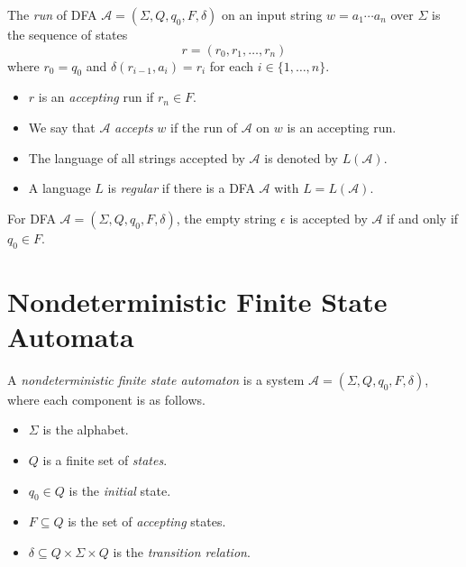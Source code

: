\begin{definition}\label{def:dfa-run}
  The \emph{run} of DFA $\mathcal{A} = (\Sigma, Q, q_0, F, \delta)$ on an input
  string $w = a_1 \cdots a_n$ over $\Sigma$ is the sequence of states
  \begin{equation*}
    r = (r_0, r_1, \dots, r_n)
  \end{equation*}
  where $r_0 = q_0$ and $\delta(r_{i-1}, a_i) = r_i$ for each
  $i \in \{1, \dots, n\}$.
  \begin{itemize}
    \item $r$ is an \emph{accepting} run if $r_n \in F$.
    \item We say that $\mathcal{A}$ \emph{accepts} $w$ if the run of
      $\mathcal{A}$ on $w$ is an accepting run.
    \item The language of all strings accepted by $\mathcal{A}$ is denoted by
      $L(\mathcal{A})$.
    \item A language $L$ is \emph{regular} if there is a DFA $\mathcal{A}$ with
      $L = L(\mathcal{A})$.
  \end{itemize}
\end{definition}

\begin{remark}
  For DFA $\mathcal{A} = (\Sigma, Q, q_0, F, \delta)$, the empty string
  $\epsilon$ is accepted by $\mathcal{A}$ if and only if $q_0 \in F$.
\end{remark}

\section{Nondeterministic Finite State Automata}
\begin{definition}\label{def:nfa}
  A \emph{nondeterministic finite state automaton} is a system
  $\mathcal{A} = (\Sigma, Q, q_0, F, \delta)$, where each component is as
  follows.
  \begin{itemize}
    \item $\Sigma$ is the alphabet.
    \item $Q$ is a finite set of \emph{states}.
    \item $q_0 \in Q$ is the \emph{initial} state.
    \item $F \subseteq Q$ is the set of \emph{accepting} states.
    \item $\delta \subseteq Q \times \Sigma \times Q$ is the
      \emph{transition relation}.
  \end{itemize}
\end{definition}


